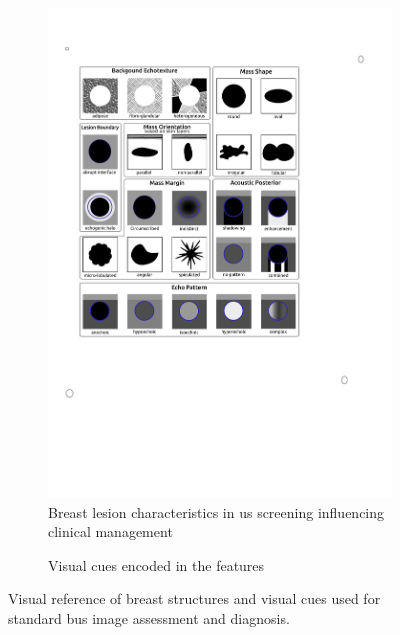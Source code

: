 \begin{figure}
\begin{subfigure}[b]{0.4\textwidth}
        \includegraphics[trim = 65 345 200 124, clip,width=\textwidth]{birads}
        \caption[]%
        {Breast lesion characteristics in \ac{us} screening influencing clinical management~\cite{biradsus}}    
        \label{fig:features:lexicon}
    \end{subfigure}
    \hfill
    \begin{subfigure}[b]{0.2\textwidth}
      \newcommand{\insertVisualCue}[2]{
        \tikz{\node[label=above:#2]{\texttt{[image: \#1]}};}
      }
      \centering
      \begin{small}
        \insertVisualCue{AppearanceCues}{Appearance}
        \vfill
        \insertVisualCue{AtlasCues}{{Atlas, Brightness}}
        \vfill
        \insertVisualCue{siftCues}{SIFT-BoF}
      \end{small}
      \caption{Visual cues encoded in the features}
      \label{fig:features:relation}
    \end{subfigure}
    \hfill
    \caption {{\small Visual reference of breast structures and visual cues used for standard \ac{bus} image assessment and diagnosis.}} 
    \label{fig:features}
\end{figure}

